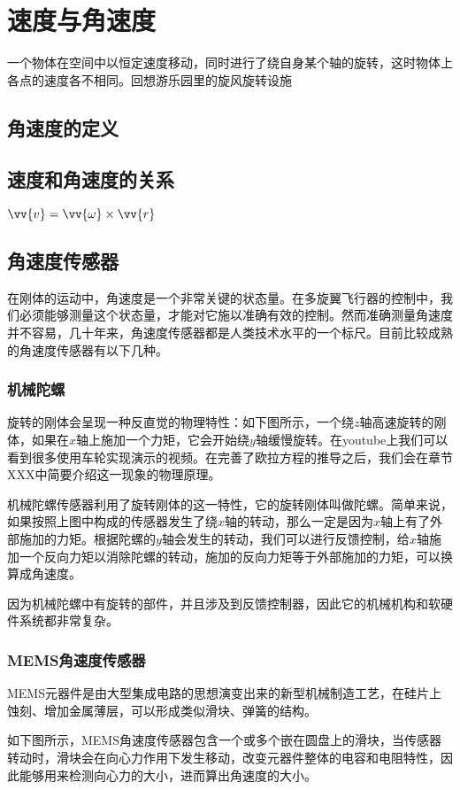 \documentclass[11pt]{article}
\begin{document}
\section{速度与角速度}
一个物体在空间中以恒定速度移动，同时进行了绕自身某个轴的旋转，这时物体上各点的速度各不相同。回想游乐园里的旋风旋转设施
\subsection{角速度的定义}	
\subsection{速度和角速度的关系}
$\vv{v} = \vv{\omega} \times  \vv{r}$
\subsection{角速度传感器}
在刚体的运动中，角速度是一个非常关键的状态量。在多旋翼飞行器的控制中，我们必须能够测量这个状态量，才能对它施以准确有效的控制。然而准确测量角速度并不容易，几十年来，角速度传感器都是人类技术水平的一个标尺。目前比较成熟的角速度传感器有以下几种。
\subsubsection{机械陀螺}
旋转的刚体会呈现一种反直觉的物理特性：如下图所示，一个绕$z$轴高速旋转的刚体，如果在$x$轴上施加一个力矩，它会开始绕$y$轴缓慢旋转。在youtube上我们可以看到很多使用车轮实现演示的视频。在完善了欧拉方程的推导之后，我们会在章节XXX中简要介绍这一现象的物理原理。

机械陀螺传感器利用了旋转刚体的这一特性，它的旋转刚体叫做陀螺。简单来说，如果按照上图中构成的传感器发生了绕$x$轴的转动，那么一定是因为$x$轴上有了外部施加的力矩。根据陀螺的$y$轴会发生的转动，我们可以进行反馈控制，给$x$轴施加一个反向力矩以消除陀螺的转动，施加的反向力矩等于外部施加的力矩，可以换算成角速度。

因为机械陀螺中有旋转的部件，并且涉及到反馈控制器，因此它的机械机构和软硬件系统都非常复杂。
\subsubsection{MEMS角速度传感器}
MEMS元器件是由大型集成电路的思想演变出来的新型机械制造工艺，在硅片上蚀刻、增加金属薄层，可以形成类似滑块、弹簧的结构。

如下图所示，MEMS角速度传感器包含一个或多个嵌在圆盘上的滑块，当传感器转动时，滑块会在向心力作用下发生移动，改变元器件整体的电容和电阻特性，因此能够用来检测向心力的大小，进而算出角速度的大小。
\end{document}
